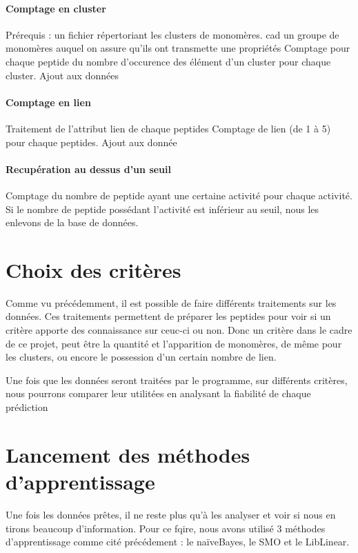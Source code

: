 \documentclass[a4paper,10pt]{report}
\begin{document}
	\paragraph{Comptage en cluster}
	    Prérequis : un fichier répertoriant les clusters de monomères.
	    cad un groupe de monomères auquel on assure qu'ils ont transmette une propriétés
	    Comptage pour chaque peptide du nombre d'occurence des élément d'un cluster pour chaque cluster.
	    Ajout aux données
	  
	\paragraph{Comptage en lien}
	    Traitement de l'attribut lien de chaque peptides
	    Comptage de lien (de 1 à 5) pour chaque peptides.
	    Ajout aux donnée
	
	\paragraph{Recupération au dessus d'un seuil}
	    Comptage du nombre de peptide ayant une certaine activité pour chaque activité.
	    Si le nombre de peptide possédant l'activité est inférieur au seuil, nous les enlevons de la base de données.
   
   
    \section{Choix des critères}
	  Comme vu précédemment, il est possible de faire différents traitements sur les données.
	  Ces traitements permettent de préparer les peptides pour voir si un critère apporte des connaissance sur ceuc-ci ou non.
	  Donc un critère dans le cadre de ce projet, peut être la quantité et l'apparition de monomères, de même pour les clusters, ou encore le possession d'un certain nombre de lien. 
	  
	  Une fois que les données seront traitées par le programme, sur différents critères, nous pourrons comparer leur utilitées en analysant la fiabilité de chaque prédiction
	 
     \section{Lancement des méthodes d'apprentissage}
	  
	  Une fois les données prêtes, il ne reste plus qu'à les analyser et voir si nous en tirons beaucoup d'information.
	  Pour ce fqire, nous avons utilisé 3 méthodes d'apprentissage comme cité précédement :
	  le naïveBayes, le SMO et le LibLinear. 
	  
\end{document}

